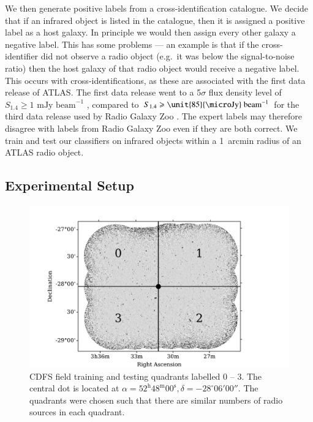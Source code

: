 \documentclass[fleqn,usenatbib,usedcolumn]{mnras}
\newcommand{\jansky}{\text{Jy}}
\begin{document}
    We then generate positive labels from a cross-identification catalogue.
    We decide that if an infrared object is listed in the catalogue, then it
    is assigned a positive label as a host galaxy. In principle we would
    then assign every other galaxy a negative label. This has some problems
    --- an example is that if the cross-identifier did not observe a radio
    object (e.g.~it was below the signal-to-noise ratio) then the host galaxy of
    that radio object would receive a negative label. This occurs with
    \citet{norris06} cross-identifications, as these are associated with the
    first data release of ATLAS. The first data release went to a 5$\sigma$ flux
    density level of $S_{1.4} \geq 1 \text{ mJy beam}^{-1}$ \citep{norris06},
    compared to $S_{1.4} \geq \unit{85}{\micro\jansky}\text{ beam}^{-1}$ for the
    third data release used by Radio Galaxy Zoo \citep{franzen15}. The expert
    labels may therefore disagree with labels from Radio Galaxy Zoo even if they
    are both correct. We train and test our classifiers on infrared objects
    within a 1~arcmin radius of an ATLAS radio object.

  \subsection{Experimental Setup}
  \label{sec:experimental-setup}

    \begin{figure}
      \centering
      \includegraphics[width=\columnwidth]{images/quadrants.pdf}
      \caption{CDFS field training and testing quadrants labelled 0 -- 3. The
        central dot is located at $\alpha = 52^\text{h}48^\text{m}00^\text{s},
        \delta = -28^\circ{}06'00''$. The quadrants were chosen such that
        there are similar numbers of radio sources in each
        quadrant.\label{fig:quadrants}}
    \end{figure}
\end{document}
